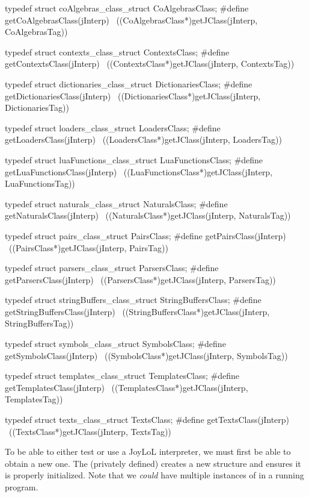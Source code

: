 typedef struct coAlgebras_class_struct CoAlgebrasClass;
#define getCoAlgebrasClass(jInterp)                         \
  ((CoAlgebrasClass*)getJClass(jInterp, CoAlgebrasTag))

typedef struct contexts_class_struct ContextsClass;
#define getContextsClass(jInterp)                           \
  ((ContextsClass*)getJClass(jInterp, ContextsTag))

typedef struct dictionaries_class_struct DictionariesClass;
#define getDictionariesClass(jInterp)                \
  ((DictionariesClass*)getJClass(jInterp, DictionariesTag))

typedef struct loaders_class_struct LoadersClass;
#define getLoadersClass(jInterp)                          \
  ((LoadersClass*)getJClass(jInterp, LoadersTag))

typedef struct luaFunctions_class_struct LuaFunctionsClass;
#define getLuaFunctionsClass(jInterp)                          \
  ((LuaFunctionsClass*)getJClass(jInterp, LuaFunctionsTag))

typedef struct naturals_class_struct NaturalsClass;
#define getNaturalsClass(jInterp)                           \
  ((NaturalsClass*)getJClass(jInterp, NaturalsTag))

typedef struct pairs_class_struct PairsClass;
#define getPairsClass(jInterp)                              \
  ((PairsClass*)getJClass(jInterp, PairsTag))

typedef struct parsers_class_struct ParsersClass;
#define getParsersClass(jInterp)                            \
  ((ParsersClass*)getJClass(jInterp, ParsersTag))

typedef struct stringBuffers_class_struct StringBuffersClass;
#define getStringBuffersClass(jInterp)                      \
  ((StringBuffersClass*)getJClass(jInterp, StringBuffersTag))

typedef struct symbols_class_struct SymbolsClass;
#define getSymbolsClass(jInterp)                            \
  ((SymbolsClass*)getJClass(jInterp, SymbolsTag))
  
typedef struct templates_class_struct TemplatesClass;
#define getTemplatesClass(jInterp)                          \
  ((TemplatesClass*)getJClass(jInterp, TemplatesTag))

typedef struct texts_class_struct TextsClass;
#define getTextsClass(jInterp)                              \
  ((TextsClass*)getJClass(jInterp, TextsTag))
\stopCHeader

\startTestSuite[newJoyLoLInterp]

To be able to either test or use a JoyLoL interpreter, we must first be 
able to obtain a new one. The (privately defined)  
creates a new  structure and ensures it is properly 
initialized. Note that we \emph{could} have multiple instances of 
\type{JoyLoLInterp} in a running program. 

